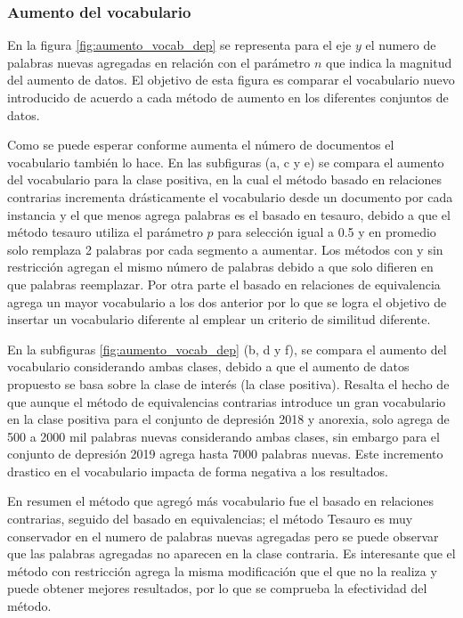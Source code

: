 \subsubsection{Aumento del vocabulario}
En la figura \ref{fig:aumento_vocab_dep} se representa para el eje $y$ el numero de palabras nuevas agregadas en relación con el parámetro $n$ que indica la magnitud del aumento de datos. El objetivo de esta figura es comparar el vocabulario nuevo introducido de acuerdo a cada método de aumento en los diferentes conjuntos de datos.

Como se puede esperar conforme aumenta el número de documentos el vocabulario también lo hace. En las subfiguras (a, c y e) se compara el aumento del vocabulario para la clase positiva, en la cual el método basado en relaciones contrarias incrementa drásticamente el vocabulario desde un documento por cada instancia y el que menos agrega palabras es el basado en tesauro, debido a que el método tesauro utiliza el parámetro $p$ para selección igual a 0.5 y en promedio solo remplaza 2 palabras por cada segmento a aumentar. Los métodos con y sin restricción agregan el mismo número de palabras debido a que solo difieren en que palabras reemplazar. Por otra parte el basado en relaciones de equivalencia agrega un mayor vocabulario a los dos anterior por lo que se logra el objetivo de insertar un vocabulario diferente al emplear un criterio de similitud diferente.

En la subfiguras \ref{fig:aumento_vocab_dep} (b, d y f), se compara el aumento del vocabulario considerando ambas clases, debido a que el aumento de datos propuesto se basa sobre la clase de interés (la clase positiva). Resalta el hecho de que aunque el método de equivalencias contrarias introduce un gran vocabulario en la clase positiva para el conjunto de depresión 2018 y anorexia, solo agrega de 500 a 2000 mil palabras nuevas considerando ambas clases, sin embargo para el conjunto de depresión 2019 agrega hasta 7000 palabras nuevas. Este incremento drastico en el vocabulario impacta de forma negativa a los resultados. 

En resumen el método que agregó más vocabulario fue el basado en relaciones contrarias, seguido del basado en equivalencias; el método Tesauro es muy conservador en el numero de palabras nuevas agregadas pero se puede observar que las palabras agregadas no aparecen en la clase contraria. Es interesante que el método con restricción agrega la misma modificación que el que no la realiza y puede obtener mejores resultados, por lo que se comprueba la efectividad del método. 

